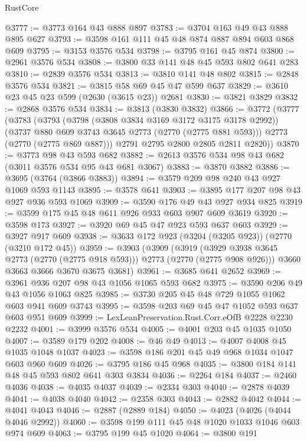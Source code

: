 \begin{lexlean}{RustCore}
\begin{coremodule}
@3777 := @3773 @164 @43 @888 @897
@3783 := @3704 @163 @49 @43 @888 @895 @627
@3793 := @3598 @161 @111 @45 @48 @874 @887 @894 @603 @868 @609
@3795 := @3153 @3576 @534
@3798 := @3795 @161 @45 @874
@3800 := @2961 @3576 @534
@3808 := @3800 @33 @141 @48 @45 @593 @802 @641 @283
@3810 := @2839 @3576 @534
@3813 := @3810 @141 @48 @802
@3815 := @2848 @3576 @534
@3821 := @3815 @58 @69 @45 @47 @599 @637
@3829 := @3610 @23 @45 @23 @599 (@2630 (@3615 @23)) @2681
@3830 := @3821 @3829
@3832 := @2868 @3576 @534
@3834 := @3813 (@3830 @3832)
@3866 := @3772
    (@3777
      (@3783
        (@3793
          (@3798 (@3808 @3834 @3169 @3172 @3175 @3178 @2992))
          (@3737 @880 @609 @3743 @3645 @2773 (@2770 (@2775 @881 @593)))
          @2773
          (@2770 (@2775 @869 @887)))
        @2791
        @2795
        @2800
        @2805
        @2811
        @2820))
@3870 := @3773 @98 @43 @593 @682
@3882 := @2613 @3576 @534 @98 @43 @682 (@3011 @3576 @534 @95 @43 @681 @3067)
@3883 := @3870 @3882
@3886 := @3695 (@3764 (@3866 @3883))
@3894 := @3579 @209 @98 @240 @43 @927 @1069 @593 @1143
@3895 := @3578 @641
@3903 := @3895 @177 @207 @98 @43 @927 @936 @593 @1069
@3909 := @3590 @176 @49 @43 @927 @934 @825
@3919 := @3599 @175 @45 @48 @611 @926 @933 @603 @907 @609 @3619
@3920 := @3598 @173
@3927 := @3920 @69 @45 @47 @923 @593 @637 @603
@3929 := @3927 @917 @609
@3938 := @3633 @172 @923 (@3204 (@3205 @923)) (@2770 (@3210 @172 @45))
@3959 := @3903
    (@3909
      (@3919 (@3929 @3938 @3645 @2773 (@2770 (@2775 @918 @593))) @2773 (@2770 (@2775 @908 @926)))
      @3660
      @3663
      @3666
      @3670
      @3675
      @3681)
@3961 := @3685 @641 @2652
@3969 := @3961 @936 @207 @98 @43 @1056 @1065 @593 @682
@3975 := @3590 @206 @49 @43 @1056 @1063 @825
@3985 := @3730 @205 @45 @48 @729 @1055 @1062 @603 @941 @609 @3743
@3995 := @3598 @203 @69 @45 @47 @1052 @593 @637 @603 @951 @609
@3999 := LexLeanPreservation.Rust.Corr.eOfB @2228 @2230 @2232
@4001 := @3999 @3576 @534
@4005 := @4001 @203 @45 @1035 @1050
@4007 := @3589 @179 @202
@4008 := @46 @49
@4013 := @4007 @4008 @45 @1035 @1048 @1037
@4023 := @3598 @186 @201 @45 @49 @968 @1034 @1047 @603 @960 @609
@4026 := @3795 @186 @45 @968
@4035 := @3800 @184 @141 @48 @45 @593 @802 @641 @303 @3834
@4036 := @2264 @184
@4037 := @2460 @4036
@4038 := @4035 @4037
@4039 := @2334 @303
@4040 := @2878 @4039
@4041 := @4038 @4040
@4042 := @2358 @303
@4043 := @2882 @4042
@4044 := @4041 @4043
@4046 := @2887 (@2889 @184)
@4050 := @4023 (@4026 (@4044 @4046 @2992))
@4060 := @3598 @199 @111 @45 @48 @1020 @1033 @1046 @603 @974 @609
@4063 := @3795 @199 @45 @1020
@4064 := @3800 @191

\end{coremodule}
\end{lexlean}
